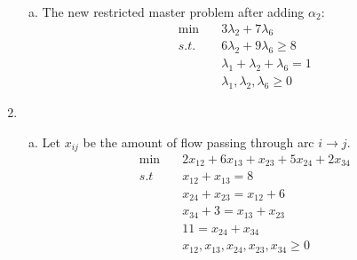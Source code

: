 \begin{enumerate}
\begin{enumerate}[(a)]
		\item The new restricted master problem after adding $\alpha_2$:
		\begin{align*}
		\min \quad &3\lambda_2+7\lambda_6\\
		s.t. \quad &6\lambda_2+9\lambda_6\ge 8\\
		&\lambda_1+\lambda_2+\lambda_6=1\\
		&\lambda_1,\lambda_2,\lambda_6\ge 0
		\end{align*}
	\end{enumerate}
	
	\newpage 
	\item {}
	\begin{enumerate}[(a)]
		\item Let $x_{ij}$ be the amount of flow passing through arc $i\rightarrow j$.
		\begin{align*}
		\min \quad & 2x_{12}+6x_{13}+x_{23}+5x_{24}+2x_{34}\\
		s.t\quad & x_{12} + x_{13} = 8\\
		&x_{24}+x_{23} = x_{12} + 6\\
		&x_{34} + 3 = x_{13}+x_{23}\\
		&11 = x_{24} + x_{34} \\
		&x_{12}, x_{13}, x_{24}, x_{23}, x_{34}\ge 0
		\end{align*}
		

\end{enumerate}
\end{enumerate}
